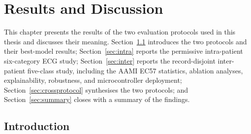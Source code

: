 %

\chapter{Results and Discussion}
\label{ch:results}

This chapter presents the results of the two evaluation protocols used in
this thesis and discusses their meaning. Section~\ref{sec:ch3_intro}
introduces the two protocols and their best-model results;
Section~\ref{sec:intra} reports the permissive intra-patient six-category
ECG study; Section~\ref{sec:inter} reports the record-disjoint inter-patient
five-class study, including the AAMI EC57 statistics, ablation analyses,
explainability, robustness, and microcontroller deployment;
Section~\ref{sec:crossprotocol} synthesises the two protocols; and
Section~\ref{sec:summary} closes with a summary of the findings.


\section{Introduction}
\label{sec:ch3_intro}

